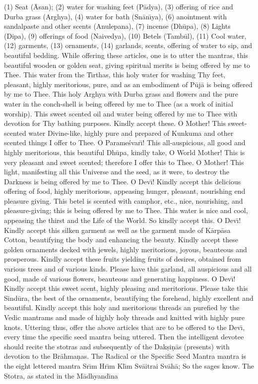 (1) Seat (\=Asan); (2) water for washing feet (P\=adya), (3) offering of rice and Durba grass (Arghya), (4) water for bath (Sn\=an\={\i}ya), (6) anointment with sandalpaste and other scents (Anulepana), (7) incense (Dh\=upa), (8) Lights (Dipa), (9) offerings of food (Naivedya), (10) Betels (Tamb\=ul), (11) Cool water, (12) garments, (13) ornaments, (14) garlands, scents, offering of water to sip, and beautiful bedding. While offering these articles, one is to utter the mantras, this beautiful wooden or golden seat, giving spiritual merits is being offered by me to Thee. This water from the T\={\i}rthas, this holy water for washing Thy feet, pleasant, highly meritorious, pure, and as an embodiment of P\=uj\=a is being offered by me to Thee. This holy Arghya with Durba grass and flowers and the pure water in the conch-shell is being offered by me to Thee (as a work of initial worship). This sweet scented oil and water being offered by me to Thee with devotion for Thy bathing purposes. Kindly accept these. O Mother! This sweet-scented water Divine-like, highly pure and prepared of Kunkuma and other scented things I offer to Thee. O Parame\'svar\={\i}! This all-auspicious, all good and highly meritorious, this beautiful Dh\=upa, kindly take, O World Mother! This is very pleasant and sweet scented; therefore I offer this to Thee. O Mother! This light, manifesting all this Universe and the seed, as it were, to destroy the Darkness is being offered by me to Thee. O Dev\={\i}! Kindly accept this delicious offering of food, highly meritorious, appeasing hunger, pleasant, nourishing end pleasure giving. This betel is scented with camphor, etc., nice, nourishing, and pleasure-giving; this is being offered by me to Thee. This water is nice and cool, appeasing the thirst and the Life of the World. So kindly accept this. O Dev\={\i}! Kindly accept this silken garment as well as the garment made of K\=arp\=asa Cotton, beautifying the body and enhancing the beauty. Kindly accept these golden ornaments decked with jewels, highly meritorious, joyous, beauteous and prosperous. Kindly accept these fruits yielding fruits of desires, obtained from various trees and of various kinds. Please have this garland, all auspicious and all good, made of various flowers, beauteous and generating happiness. O Dev\={\i}! Kindly accept this sweet scent, highly pleasing and meritorious. Please take this Sind\=ura, the best of the ornaments, beautifying the forehead, highly excellent and beautiful. Kindly accept this holy and meritorious threads an purefied by the Vedic mantrams and made of highly holy threads and knitted with highly pure knots. Uttering thus, offer the above articles that are to be offered to the Dev\={\i}, every time the specific seed mantra being uttered. Then the intelligent devotee should recite the stotras and subsequently of the Dak\d{s}i\d{n}\=as (presents) with devotion to the Br\=ahma\d{n}as. The Radical or the Specific Seed Mantra mantra is the eight lettered mantra Sr\={\i}m Hr\={\i}m Kl\={\i}m Sv\=aitrai Sv\=ah\=a; So the sages know. The Stotra, as stated in the M\=adhyand\={\i}na

